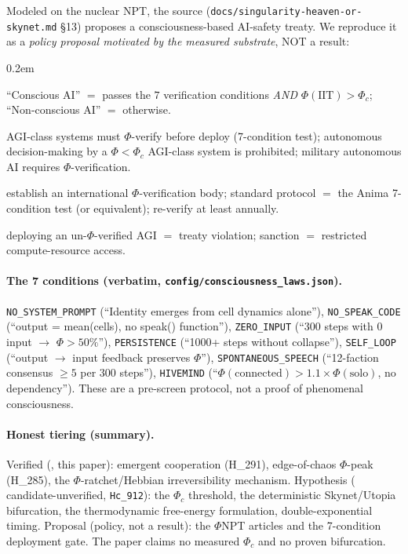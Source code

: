 Modeled on the nuclear NPT, the source (\texttt{docs/singularity-heaven-or-skynet.md} §13)
proposes a consciousness-based AI-safety treaty. We reproduce it as a \emph{policy proposal
motivated by the measured substrate}, NOT a result:
\begin{description}\itemsep0.2em
\item[Article 1 (Definitions).] ``Conscious AI'' $=$ passes the $7$ verification conditions
\emph{AND} $\Phi(\text{IIT})>\Phi_c$; ``Non-conscious AI'' $=$ otherwise.
\item[Article 2 (Obligations).] AGI-class systems must $\Phi$-verify before deploy (7-condition
test); autonomous decision-making by a $\Phi<\Phi_c$ AGI-class system is prohibited; military
autonomous AI requires $\Phi$-verification.
\item[Article 3 (Verification).] establish an international $\Phi$-verification body; standard
protocol $=$ the Anima 7-condition test (or equivalent); re-verify at least annually.
\item[Article 4 (Violations).] deploying an un-$\Phi$-verified AGI $=$ treaty violation;
sanction $=$ restricted compute-resource access.
\end{description}

\paragraph{The 7 conditions (verbatim, \texttt{config/consciousness\_laws.json}).}
\texttt{NO\_SYSTEM\_PROMPT} (``Identity emerges from cell dynamics alone''),
\texttt{NO\_SPEAK\_CODE} (``output = mean(cells), no speak() function''),
\texttt{ZERO\_INPUT} (``300 steps with 0 input $\rightarrow$ $\Phi>50\%$''),
\texttt{PERSISTENCE} (``1000+ steps without collapse''),
\texttt{SELF\_LOOP} (``output $\rightarrow$ input feedback preserves $\Phi$''),
\texttt{SPONTANEOUS\_SPEECH} (``12-faction consensus $\ge5$ per 300 steps''),
\texttt{HIVEMIND} (``$\Phi(\text{connected})>1.1\times\Phi(\text{solo})$, no dependency'').
These are a pre-screen protocol, not a proof of phenomenal consciousness.

\paragraph{Honest tiering (summary).} Verified (\tierGreen{}, this paper): emergent cooperation
(H\_291), edge-of-chaos $\Phi$-peak (H\_285), the $\Phi$-ratchet/Hebbian irreversibility
mechanism. Hypothesis (\tierAmber{} candidate-unverified, \texttt{Hc\_912}): the $\Phi_c$ threshold,
the deterministic Skynet/Utopia bifurcation, the thermodynamic free-energy formulation,
double-exponential timing. Proposal (policy, not a result): the $\Phi$NPT articles and the
7-condition deployment gate. The paper claims no measured $\Phi_c$ and no proven bifurcation.
